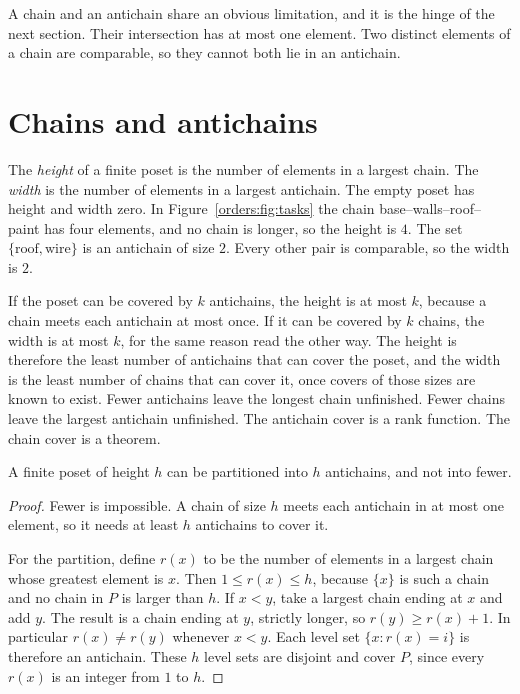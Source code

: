 A chain and an antichain share an obvious limitation, and it is the hinge of the next section. Their intersection has at most one element. Two distinct elements of a chain are comparable, so they cannot both lie in an antichain.

\section{Chains and antichains}

The \emph{height} of a finite poset is the number of elements in a largest chain. The \emph{width} is the number of elements in a largest antichain. The empty poset has height and width zero. In Figure~\ref{orders:fig:tasks} the chain base--walls--roof--paint has four elements, and no chain is longer, so the height is $4$. The set $\{\text{roof},\text{wire}\}$ is an antichain of size $2$. Every other pair is comparable, so the width is $2$.

If the poset can be covered by $k$ antichains, the height is at most $k$, because a chain meets each antichain at most once. If it can be covered by $k$ chains, the width is at most $k$, for the same reason read the other way. The height is therefore the least number of antichains that can cover the poset, and the width is the least number of chains that can cover it, once covers of those sizes are known to exist. Fewer antichains leave the longest chain unfinished. Fewer chains leave the largest antichain unfinished. The antichain cover is a rank function. The chain cover is a theorem.

\begin{theorem}[Mirsky, 1971]\label{orders:thm:mirsky}
A finite poset of height $h$ can be partitioned into $h$ antichains, and not into fewer.
\end{theorem}
\begin{proof}
Fewer is impossible. A chain of size $h$ meets each antichain in at most one element, so it needs at least $h$ antichains to cover it.

For the partition, define $r(x)$ to be the number of elements in a largest chain whose greatest element is $x$. Then $1\le r(x)\le h$, because $\{x\}$ is such a chain and no chain in $P$ is larger than $h$. If $x<y$, take a largest chain ending at $x$ and add $y$. The result is a chain ending at $y$, strictly longer, so $r(y)\ge r(x)+1$. In particular $r(x)\ne r(y)$ whenever $x<y$. Each level set $\{x:r(x)=i\}$ is therefore an antichain. These $h$ level sets are disjoint and cover $P$, since every $r(x)$ is an integer from $1$ to $h$.
\end{proof}

